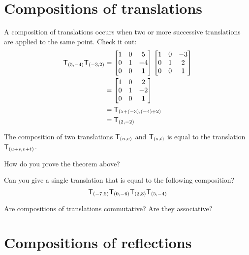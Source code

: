 \documentclass{ximera}
\begin{document}
\section{Compositions of translations}

A composition of translations occurs when two or more successive
translations are applied to the same point. Check it out:
\begin{align*}
\mathsf{T}_{(5,-4)}\mathsf{T}_{(-3,2)} &= \begin{bmatrix}
1 & 0 &  5\\
0 & 1 & -4\\
0 & 0 &  1
\end{bmatrix}
\begin{bmatrix}
1 & 0 & -3\\
0 & 1 &  2\\
0 & 0 &  1
\end{bmatrix}\\
&=\begin{bmatrix}
1 & 0 &  2\\
0 & 1 & -2\\
0 & 0 &  1
\end{bmatrix}\\
&=\mathsf{T}_{(5+(-3),(-4)+2)}\\
&=\mathsf{T}_{(2,-2)}
\end{align*}

\begin{theorem}
The composition of two translations $\mathsf{T}_{(u,v)}$ and
$\mathsf{T}_{(s,t)}$ is equal to the translation $\mathsf{T}_{(u+s,v+t)}$.
\end{theorem}

\begin{question} How do you prove the theorem above?
\end{question}


\begin{question}
Can you give a single translation that is equal to the following composition?
\[
\mathsf{T}_{(-7,5)}\mathsf{T}_{(0,-6)}\mathsf{T}_{(2,8)}\mathsf{T}_{(5,-4)}
\]
\end{question}


\begin{question}
Are compositions of translations commutative?  Are they
associative?
\end{question}



\section{Compositions of reflections}
\end{document}
